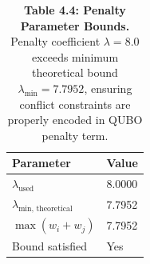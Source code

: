 \begin{table}[H]
\centering
\caption{\textbf{Table 4.4: Penalty Parameter Bounds.} Penalty coefficient $\lambda = 8.0$ exceeds minimum theoretical bound $\lambda_{\min} = 7.7952$, ensuring conflict constraints are properly encoded in QUBO penalty term.}
\label{tab:4-4}
\small
\begin{tabular}{ll}
\toprule
\textbf{Parameter} & \textbf{Value} \\
\midrule
\rowcolor{gray!15}
$\lambda_{\text{used}}$ & 8.0000 \\
$\lambda_{\text{min, theoretical}}$ & 7.7952 \\
\rowcolor{gray!15}
$\max(w_i + w_j)$ & 7.7952 \\
Bound satisfied & Yes \\
\bottomrule
\end{tabular}
\end{table}
